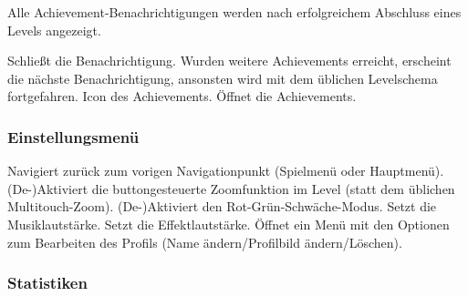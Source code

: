 Alle Achievement-Benachrichtigungen werden nach erfolgreichem Abschluss eines Levels angezeigt.
\begin{requirements}
 Schließt die Benachrichtigung. Wurden weitere Achievements erreicht, erscheint die nächste Benachrichtigung, ansonsten wird mit dem üblichen Levelschema fortgefahren. 
 Icon des Achievements. Öffnet die Achievements.
\end{requirements} 

\subsubsection{Einstellungsmenü}

\begin{center}
\setlength\fboxsep{20pt}
\setlength\fboxrule{1pt}
\end{center}

\begin{requirements}
 Navigiert zurück zum vorigen Navigationpunkt (Spielmenü oder Hauptmenü).
 (De-)Aktiviert die buttongesteuerte Zoomfunktion im Level (statt dem üblichen Multitouch-Zoom).
 (De-)Aktiviert den Rot-Grün-Schwäche-Modus.
 Setzt die Musiklautstärke.
 Setzt die Effektlautstärke.
 Öffnet ein Menü mit den Optionen zum Bearbeiten des Profils (Name ändern/Profilbild ändern/Löschen).
\end{requirements}

\subsubsection{Statistiken}

